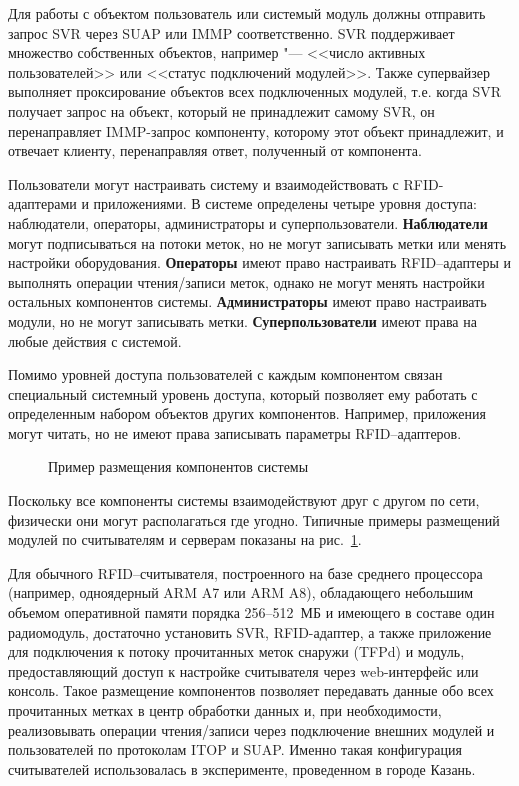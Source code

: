 Для работы с объектом пользователь или системый модуль должны отправить запрос SVR через SUAP или IMMP соответственно. SVR поддерживает множество собственных объектов, например "--- <<число активных пользователей>> или <<статус подключений модулей>>. Также супервайзер выполняет проксирование объектов всех подключенных модулей, т.е. когда SVR получает запрос на объект, который не принадлежит самому SVR, он перенаправляет IMMP-запрос компоненту, которому этот объект принадлежит, и отвечает клиенту, перенаправляя ответ, полученный от компонента.

Пользователи могут настраивать систему и взаимодействовать с RFID-адаптерами и приложениями. В системе определены четыре уровня доступа: наблюдатели, операторы, администраторы и суперпользователи. \textbf{Наблюдатели} могут подписываться на потоки меток, но не могут записывать метки или менять настройки оборудования. \textbf{Операторы} имеют право настраивать RFID--адаптеры и выполнять операции чтения/записи меток, однако не могут менять настройки остальных компонентов системы. \textbf{Администраторы} имеют право настраивать модули, но не могут записывать метки. \textbf{Суперпользователи} имеют права на любые действия с системой.

Помимо уровней доступа пользователей с каждым компонентом связан специальный системный уровень доступа, который позволяет ему работать с определенным набором объектов других компонентов. Например, приложения могут читать, но не имеют права записывать параметры RFID--адаптеров.

\begin{figure}[ht]
  \caption{Пример размещения компонентов системы}
  \label{fig:ch5_deployment_example}
\end{figure}

Поскольку все компоненты системы взаимодействуют друг с другом по сети, физически они могут располагаться где угодно. Типичные примеры размещений модулей по считывателям и серверам показаны на рис.~\ref{fig:ch5_deployment_example}.

Для обычного RFID--считывателя, построенного на базе среднего процессора (например, одноядерный ARM A7 или ARM A8), обладающего небольшим объемом оперативной памяти порядка 256--512~МБ и имеющего в составе один радиомодуль, достаточно установить SVR, RFID-адаптер, а также приложение для подключения к потоку прочитанных меток снаружи (TFPd) и модуль, предоставляющий доступ к настройке считывателя через web-интерфейс или консоль. Такое размещение компонентов позволяет передавать данные обо всех прочитанных метках в центр обработки данных и, при необходимости, реализовывать операции чтения/записи через подключение внешних модулей и пользователей по протоколам ITOP и SUAP. Именно такая конфигурация считывателей использовалась в эксперименте, проведенном в городе Казань.

